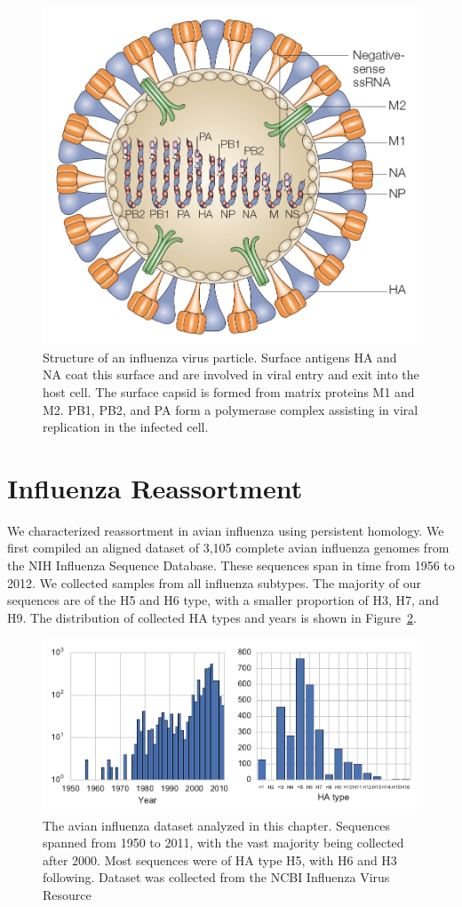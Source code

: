 \begin{figure}
\begin{center}
\centerline{\includegraphics[width=.5\columnwidth]{./fig/influenza/flu_genome.jpg}}
\caption[Structure of an influenza virus particle]{Structure of an influenza virus particle. Surface antigens HA and NA coat this surface and are involved in viral entry and exit into the host cell. The surface capsid is formed from matrix proteins M1 and M2. PB1, PB2, and PA form a polymerase complex assisting in viral replication in the infected cell.}
\label{fig:flu:genome}
\end{center}
\end{figure}

\section{Influenza Reassortment}
\label{flu:reassortment}

We characterized reassortment in avian influenza using persistent homology.
We first compiled an aligned dataset of 3,105 complete avian influenza genomes from the NIH Influenza Sequence Database.
These sequences span in time from 1956 to 2012. 
We collected samples from all influenza subtypes.
The majority of our sequences are of the H5 and H6 type, with a smaller proportion of H3, H7, and H9.
The distribution of collected HA types and years is shown in Figure~\ref{fig:flu:histograms}.

\begin{figure}
\centering
\includegraphics[]{fig/influenza/flu_histograms.pdf}
\caption[Influenza Dataset Statistics]{The avian influenza dataset analyzed in this chapter. Sequences spanned from 1950 to 2011, with the vast majority being collected after 2000. Most sequences were of HA type H5, with H6 and H3 following. Dataset was collected from the NCBI Influenza Virus Resource \cite{Bao:2008cq}}
\label{fig:flu:histograms}
\end{figure}


